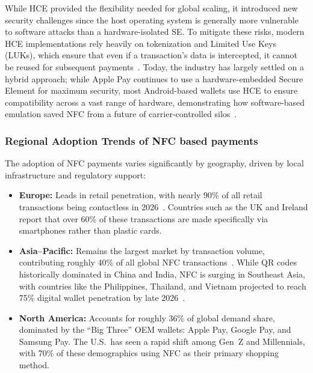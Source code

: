 \documentclass[sigconf, nonacm]{acmart}
\begin{document}
While HCE provided the flexibility needed for global scaling, it introduced new security challenges since the host operating system is generally more vulnerable to software attacks than a hardware-isolated SE. To mitigate these risks, modern HCE implementations rely heavily on tokenization and Limited Use Keys (LUKs), which ensure that even if a transaction's data is intercepted, it cannot be reused for subsequent payments~\cite{crowe2016understanding}. Today, the industry has largely settled on a hybrid approach; while Apple Pay continues to use a hardware-embedded Secure Element for maximum security, most Android-based wallets use HCE to ensure compatibility across a vast range of hardware, demonstrating how software-based emulation saved NFC from a future of carrier-controlled silos~\cite{whitepaperhce}.


\subsubsection{Regional Adoption Trends of NFC based payments}

The adoption of NFC payments varies significantly by geography, driven by local infrastructure and regulatory support:


\begin{itemize}
    \item \textbf{Europe:} Leads in retail penetration, with nearly 90\% of all retail transactions being contactless in 2026~\cite{ejimone2025contactless}. Countries such as the UK and Ireland report that over 60\% of these transactions are made specifically via smartphones rather than plastic cards.
    
    \item \textbf{Asia--Pacific:} Remains the largest market by transaction volume, contributing roughly 40\% of all global NFC transactions~\cite{dey2025nfc}. While QR codes historically dominated in China and India, NFC is surging in Southeast Asia, with countries like the Philippines, Thailand, and Vietnam projected to reach 75\% digital wallet penetration by late 2026~\cite{juniper2022digital}.
    
    \item \textbf{North America:} Accounts for roughly 36\% of global demand share, dominated by the ``Big Three'' OEM wallets: Apple Pay, Google Pay, and Samsung Pay. The U.S.\ has seen a rapid shift among Gen~Z and Millennials, with 70\% of these demographics using NFC as their primary shopping method.
\end{itemize}
\end{document}
